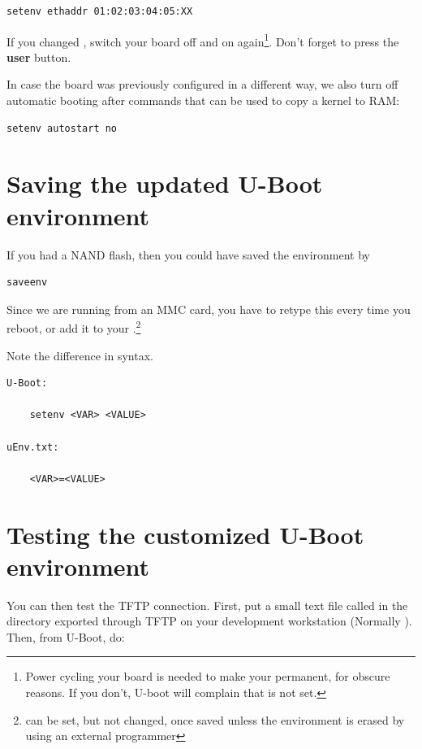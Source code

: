 \begin{verbatim}
setenv ethaddr 01:02:03:04:05:XX
\end{verbatim}

If you changed , switch your board off and on again\footnote{Power cycling your
  board is needed to make your  permanent, for obscure
  reasons. If you don't, U-boot will complain that  is not
  set.}. Don't forget to press the {\bf user} button.

In case the board was previously configured in a different way, we
also turn off automatic booting after commands that can be used to
copy a kernel to RAM:

\begin{verbatim}
setenv autostart no
\end{verbatim}

\clearpage
\section{Saving the updated U-Boot environment}

If you had a NAND flash, then you could have saved the environment by

\begin{verbatim}
saveenv
\end{verbatim}

Since we are running from an MMC card, you have to retype this every time you reboot,
or add it to your .\footnote{ can be set, but not changed,
once saved unless the environment is erased by using an external programmer}

Note the difference in syntax.
\begin{lstlisting}
U-Boot:

	setenv <VAR> <VALUE>

uEnv.txt:

	<VAR>=<VALUE>

\end{lstlisting}

\section{Testing the customized U-Boot environment}

You can then test the TFTP connection. First, put a small text file called
 in the directory exported through TFTP on your development
workstation (Normally ). Then, from U-Boot, do:

